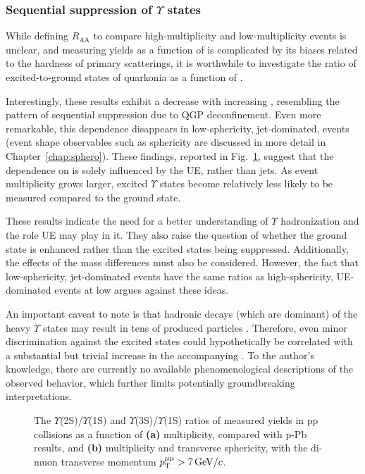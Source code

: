 \subsubsection*{Sequential suppression of $\Upsilon$ states}

While defining $R_\mathrm{AA}$ to compare high-multiplicity and low-multiplicity events is unclear, and measuring yields as a function of \Nch is complicated by its biases related to the hardness of primary scatterings, it is worthwhile to investigate the ratio of excited-to-ground states of quarkonia as a function of \Nch.

Interestingly, these results \cite{cmscollaborationInvestigationEventactivityDependence2020} exhibit a decrease with increasing \Nch, resembling the pattern of sequential suppression due to QGP deconfinement. Even more remarkable, this dependence disappears in low-sphericity, jet-dominated, events (event shape observables such as sphericity are discussed in more detail in Chapter~\ref{chap:sphero}). These findings, reported in Fig.~\ref{fig:colls:ssupsilon}, suggest that the dependence on \Nch is solely influenced by the UE, rather than jets. As event multiplicity grows larger, excited $\Upsilon$ states become relatively less likely to be measured compared to the ground state.

These results indicate the need for a better understanding of $\Upsilon$ hadronization and the role UE may play in it. They also raise the question of whether the ground state is enhanced rather than the excited states being suppressed. Additionally, the effects of the mass differences must also be considered. However, the fact that low-sphericity, jet-dominated events have the same ratios as high-sphericity, UE-dominated events at low \Nch argues against these ideas.

An important caveat to note is that hadronic decays (which are dominant) of the heavy $\Upsilon$ states may result in tens of produced particles \cite{behrendsInclusiveHadronProduction1985}. Therefore, even minor discrimination against the excited states could hypothetically be correlated with a substantial but trivial increase in the accompanying \Nch. To the author's knowledge, there are currently no available phenomenological descriptions of the observed behavior, which further limits potentially groundbreaking interpretations.

\begin{figure}[H]
\hspace{1em} 
\caption{The $\Upsilon$(2S)/$\Upsilon$(1S) and $\Upsilon$(3S)/$\Upsilon$(1S) ratios of measured yields in pp collisions as a function of \textbf{(a)} multiplicity, compared with p-Pb results, and \textbf{(b)} multiplicity and transverse sphericity, with the di-muon transverse momentum $p_{\text{T}}^{\mu\mu}>7 \text{\,GeV/$c$}$. \cite{cmscollaborationInvestigationEventactivityDependence2020}}
\label{fig:colls:ssupsilon}
\end{figure}

